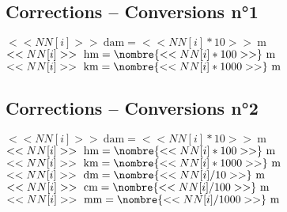\documentclass[a4paper,11pt,fleqn]{article}
\begin{document}
\subsection*{Corrections -- Conversions n°1}

\begin{multicols}{4}


$<<NN[i]>>~\text{dam}=<<NN[i]*10>>~\text{m}$
$<<NN[i]>>~\text{hm}=\nombre{<<NN[i]*100>>}~\text{m}$
$<<NN[i]>>~\text{km}=\nombre{<<NN[i]*1000>>}~\text{m}$

	
\end{multicols}



\subsection*{Corrections -- Conversions n°2}

\begin{multicols}{4}


$<<NN[i]>>~\text{dam}=<<NN[i]*10>>~\text{m}$
$<<NN[i]>>~\text{hm}=\nombre{<<NN[i]*100>>}~\text{m}$
$<<NN[i]>>~\text{km}=\nombre{<<NN[i]*1000>>}~\text{m}$
$<<NN[i]>>~\text{dm}=\nombre{<<NN[i]/10>>}~\text{m}$
$<<NN[i]>>~\text{cm}=\nombre{<<NN[i]/100>>}~\text{m}$
$<<NN[i]>>~\text{mm}=\nombre{<<NN[i]/1000>>}~\text{m}$

	
\end{multicols}
\end{document}
